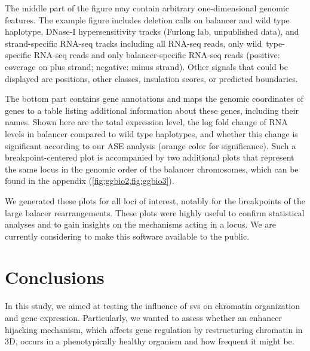 The middle part of the figure may contain arbitrary one-dimensional genomic
features. The example figure includes  deletion calls on balancer and
wild type haplotype,  DNase-I hypersensitivity tracks (Furlong lab,
unpublished data), and strand-specific RNA-seq tracks including  all
RNA-seq reads, only  wild\ type-specific RNA-seq reads and only
 balancer-specific RNA-seq reads (positive: coverage on plus strand;
negative: minus strand). Other signals that could be displayed
are \snv positions, other \sv classes, insulation scores, or predicted
\tad boundaries.

The bottom part contains  gene annotations and maps the
genomic coordinates of genes to a table listing additional information about
these genes, including their names. Shown here are the  total
expression level, the  log fold change of RNA levels in balancer
compared to wild type haplotypes, and whether this change is significant
according to our ASE analysis (orange color for significance).
Such a breakpoint-centered plot is accompanied by two additional
plots that represent the same locus in the genomic order of the balancer
chromosomes, which can be found in the appendix (\cref{fig:ggbio2,fig:ggbio3}).

We generated these plots for all loci of interest, notably for the breakpoints
of the large balacer rearrangements. These plots were highly useful to confirm
statistical analyses and to gain insights on the mechanisms acting in a locus.
We are currently considering to make this software available to the public.






\section{Conclusions}
\label{sec:balancer_concl}

In this study, we aimed at testing the influence of \acp{sv} on chromatin
organization and gene expression. Particularly, we wanted to assess whether an
enhancer hijacking mechanism, which affects gene regulation by restructuring
chromatin in 3D, occurs in a phenotypically healthy organism and how frequent it
might be.


